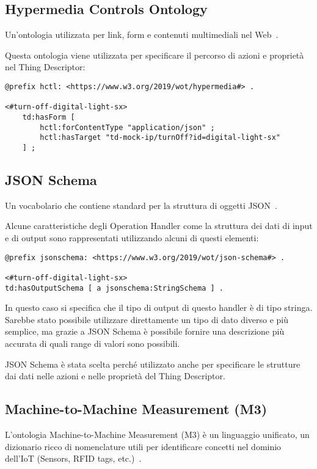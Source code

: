 \subsection{Hypermedia Controls Ontology}
Un'ontologia utilizzata per link, form e contenuti multimediali nel Web~\cite{Hypermed84:online}.

\noindent Questa ontologia viene utilizzata per specificare il percorso di azioni e proprietà nel Thing Descriptor:
\begin{verbatim}
@prefix hctl: <https://www.w3.org/2019/wot/hypermedia#> .

<#turn-off-digital-light-sx>
	td:hasForm [
		hctl:forContentType "application/json" ;
		hctl:hasTarget "td-mock-ip/turnOff?id=digital-light-sx"
	] ;
\end{verbatim}

\subsection{JSON Schema}
Un vocabolario che contiene standard per la struttura di oggetti JSON~\cite{JSONSche6:online}.

\noindent Alcune caratteristiche degli Operation Handler come la struttura dei dati di input e di output sono rappresentati utilizzando alcuni di questi elementi:
\begin{verbatim}
@prefix jsonschema: <https://www.w3.org/2019/wot/json-schema#> .

<#turn-off-digital-light-sx>
td:hasOutputSchema [ a jsonschema:StringSchema ] .
\end{verbatim}
\noindent In questo caso si specifica che il tipo di output di questo handler è di tipo stringa. Sarebbe stato possibile utilizzare direttamente un tipo di dato diverso e più semplice, ma grazie a JSON Schema è possibile fornire una descrizione più accurata di quali range di valori sono possibili.

\noindent JSON Schema è stata scelta perché utilizzato anche per specificare le strutture dai dati nelle azioni e nelle proprietà del Thing Descriptor.


\subsection{Machine-to-Machine Measurement (M3)}
L'ontologia Machine-to-Machine Measurement (M3) è un linguaggio unificato, un dizionario ricco di nomenclature utili per identificare concetti nel dominio dell'IoT (Sensors, RFID tags, etc.)~\cite{SWoTSema18:online}.

